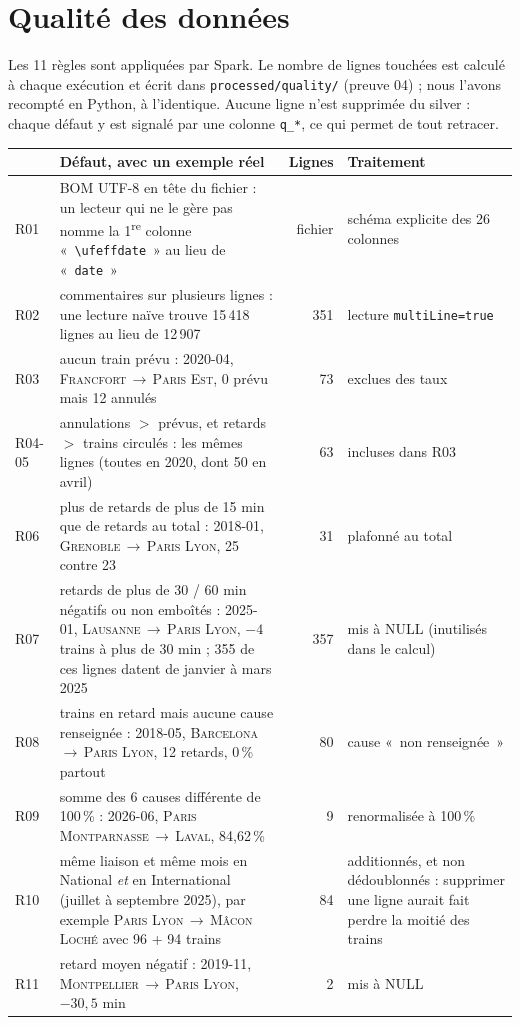 \documentclass[10pt,a4paper]{article}
\newcommand{\code}[1]{\texttt{\small #1}}
\begin{document}
\section{Qualité des données}\label{sec:qualite}

Les 11 règles sont appliquées par Spark. Le nombre de lignes touchées est calculé à chaque exécution et écrit dans \code{processed/quality/} (preuve 04) ; nous l'avons recompté en Python, à l'identique. Aucune ligne n'est supprimée du silver : chaque défaut y est signalé par une colonne \code{q\_*}, ce qui permet de tout retracer.

{\footnotesize
\begin{tabularx}{\linewidth}{@{}l >{\raggedright\arraybackslash}X r >{\raggedright\arraybackslash}p{4.1cm}@{}}
\toprule
 & \textbf{Défaut, avec un exemple réel} & \textbf{Lignes} & \textbf{Traitement} \\
\midrule
R01 & BOM UTF-8 en tête du fichier : un lecteur qui ne le gère pas nomme la 1\textsuperscript{re} colonne «~\code{\textbackslash ufeffdate}~» au lieu de «~\code{date}~» & fichier & schéma explicite des 26 colonnes \\
R02 & commentaires sur plusieurs lignes : une lecture naïve trouve 15\,418 lignes au lieu de 12\,907 & 351 & lecture \code{multiLine=true} \\
R03 & aucun train prévu : 2020-04, \textsc{Francfort}\,$\rightarrow$\,\textsc{Paris Est}, 0 prévu mais 12 annulés & 73 & exclues des taux \\
R04-05 & annulations $>$ prévus, et retards $>$ trains circulés : les mêmes lignes (toutes en 2020, dont 50 en avril) & 63 & incluses dans R03 \\
R06 & plus de retards de plus de 15 min que de retards au total : 2018-01, \textsc{Grenoble}\,$\rightarrow$\,\textsc{Paris Lyon}, 25 contre 23 & 31 & plafonné au total \\
R07 & retards de plus de 30 / 60 min négatifs ou non emboîtés : 2025-01, \textsc{Lausanne}\,$\rightarrow$\,\textsc{Paris Lyon}, $-4$ trains à plus de 30 min ; 355 de ces lignes datent de janvier à mars 2025 & 357 & mis à NULL (inutilisés dans le calcul) \\
R08 & trains en retard mais aucune cause renseignée : 2018-05, \textsc{Barcelona}\,$\rightarrow$\,\textsc{Paris Lyon}, 12 retards, 0\,\% partout & 80 & cause «~non renseignée~» \\
R09 & somme des 6 causes différente de 100\,\% : 2026-06, \textsc{Paris Montparnasse}\,$\rightarrow$\,\textsc{Laval}, 84,62\,\% & 9 & renormalisée à 100\,\% \\
R10 & même liaison et même mois en National \emph{et} en International (juillet à septembre 2025), par exemple \textsc{Paris Lyon}\,$\rightarrow$\,\textsc{Mâcon Loché} avec 96 + 94 trains & 84 & additionnés, et non dédoublonnés : supprimer une ligne aurait fait perdre la moitié des trains \\
R11 & retard moyen négatif : 2019-11, \textsc{Montpellier}\,$\rightarrow$\,\textsc{Paris Lyon}, $-30{,}5$ min & 2 & mis à NULL \\
\bottomrule
\end{tabularx}}
\end{document}
